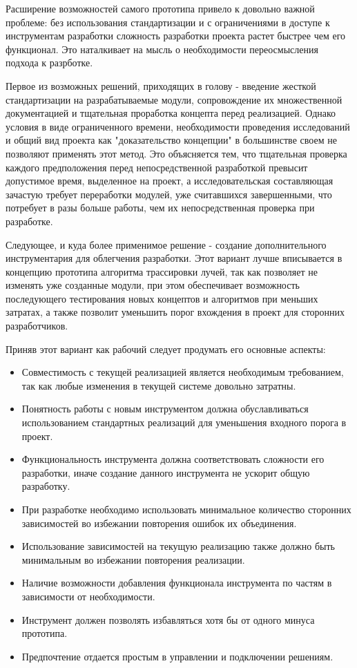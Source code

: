 Расширение возможностей самого прототипа привело к довольно важной проблеме: без использования стандартизации и с ограничениями в доступе к инструментам разработки сложность разработки проекта растет быстрее чем его функционал. Это наталкивает на мысль о необходимости переосмысления подхода к разрботке.

Первое из возможных решений, приходящих в голову - введение жесткой стандартизации на разрабатываемые модули, сопровождение их множественной документацией и тщательная проработка концепта перед реализацией. Однако условия в виде ограниченного времени, необходимости проведения исследований и общий вид проекта как "доказательство концепции" в большинстве своем не позволяют применять этот метод. Это объясняется тем, что тщательная проверка каждого предположения перед непосредственной разработкой превысит допустимое время, выделенное на проект, а исследовательская составляющая зачастую требует переработки модулей, уже считавшихся завершенными, что потребует в разы больше работы, чем их непосредственная проверка при разработке. 

Следующее, и куда более применимое решение - создание дополнительного инструментария для облегчения разработки. Этот вариант лучше вписывается в концепцию прототипа алгоритма трассировки лучей, так как позволяет не изменять уже созданные модули, при этом обеспечивает возможность последующего тестирования новых концептов и алгоритмов при меньших затратах, а также позволит уменьшить порог вхождения в проект для сторонних разработчиков.

Приняв этот вариант как рабочий следует продумать его основные аспекты:

\begin{itemize}
	\item Совместимость с текущей реализацией является необходимым требованием, так как любые изменения в текущей системе довольно затратны.
	\item Понятность работы с новым инструментом должна обуславливаться использованием стандартных реализаций для уменьшения входного порога в проект.
	\item Функциональность инструмента должна соответствовать сложности его разработки, иначе создание данного инструмента не ускорит общую разработку.
	\item При разработке необходимо использовать минимальное количество сторонних зависимостей во избежании повторения ошибок их объединения.
	\item Использование зависимостей на текущую реализацию также должно быть минимальным во избежании повторения реализации.
	\item Наличие возможности добавления функционала инструмента по частям в зависимости от необходимости.
	\item Инструмент должен позволять избавляться хотя бы от одного минуса прототипа. 
	\item Предпочтение отдается простым в управлении и подключении решениям.
\end {itemize}

